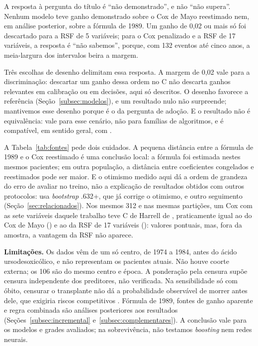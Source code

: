 \documentclass[12pt]{article}
\begin{document}
A resposta à pergunta do título é ``não demonstrado'', e não ``não supera''. Nenhum modelo teve ganho demonstrado sobre o Cox de Mayo reestimado nem, em análise posterior, sobre a fórmula de 1989. Um ganho de 0,02 ou mais só foi descartado para a RSF de 5 variáveis; para o Cox penalizado e a RSF de 17 variáveis, a resposta é ``não sabemos'', porque, com 132 eventos até cinco anos, a meia-largura dos intervalos beira a margem.

Três escolhas de desenho delimitam essa resposta. A margem de 0,02 vale para a discriminação: descartar um ganho dessa ordem no C não descarta ganhos relevantes em calibração ou em decisões, aqui só descritos. O desenho favorece a referência (Seção~\ref{subsec:modelos}), e um resultado nulo não surpreende; mantivemos esse desenho porque é o da pergunta de adoção. E o resultado não é equivalência: vale para esse cenário, não para famílias de algoritmos, e é compatível, em sentido geral, com \cite{christodoulou2019systematic}.

A Tabela~\ref{tab:fontes} pede dois cuidados. A pequena distância entre a fórmula de 1989 e o Cox reestimado é uma conclusão local: a fórmula foi estimada nestes mesmos pacientes; em outra população, a distância entre coeficientes congelados e reestimados pode ser maior. E o otimismo medido aqui dá a ordem de grandeza do erro de avaliar no treino, não a explicação de resultados obtidos com outros protocolos: \cite{graf2026coxrsf} usa \textit{bootstrap} .632+, que já corrige o otimismo, e outro seguimento (Seção~\ref{sec:relacionados}). Nos mesmos 312 e nas mesmas partições, um Cox com as sete variáveis daquele trabalho teve C de Harrell de \harrellGraf, praticamente igual ao do Cox de Mayo (\harrellMayo) e ao da RSF de 17 variáveis (\harrellRSF): valores pontuais, mas, fora da amostra, a vantagem da RSF não aparece.

\textbf{Limitações.} Os dados vêm de um só centro, de 1974 a 1984, antes do ácido ursodesoxicólico, e não representam os pacientes atuais. Não houve coorte externa; os 106 são do mesmo centro e época. A ponderação pela censura supõe censura independente dos preditores, não verificada. Na sensibilidade só com óbito, censurar o transplante não dá a probabilidade observável de morrer antes dele, que exigiria riscos competitivos \cite{putter2007competing}. Fórmula de 1989, fontes de ganho aparente e regra combinada são análises posteriores aos resultados (Seções~\ref{subsec:incremental} e~\ref{subsec:complementares}). A conclusão vale para os modelos e grades avaliados; na sobrevivência, não testamos \textit{boosting} nem redes neurais.
\end{document}
